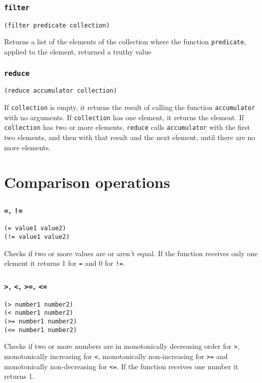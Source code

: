\documentclass[11pt]{scrreprt}
\begin{document}
\subsubsection{\texttt{filter}}
\begin{verbatim}
(filter predicate collection)
\end{verbatim}
Returns a list of the elements of the collection where the function \texttt{predicate}, applied to the element, returned a truthy value

\subsubsection{\texttt{reduce}}
\begin{verbatim}
(reduce accumulator collection)
\end{verbatim}
If \texttt{collection} is empty, it returns the result of calling the function \texttt{accumulator} with no arguments. If \texttt{collection} has one element, it returns the element. If \texttt{collection} has two or more elements, \texttt{reduce} calls \texttt{accumulator} with the first two elements, and then with that result and the next element, until there are no more elements.


\section{Comparison operations}
\label{ComparisonOp}
\subsubsection{\texttt{=}, \texttt{!=}}
\begin{verbatim}
(= value1 value2)
(!= value1 value2)
\end{verbatim}
Checks if two or more values are or aren't equal. If the function receives only one element it returns 1 for \texttt{=} and 0 for \texttt{!=}.

\subsubsection{\texttt{>}, \texttt{<}, \texttt{>=}, \texttt{<=}}
\begin{verbatim}
(> number1 number2)
(< number1 number2)
(>= number1 number2)
(<= number1 number2)
\end{verbatim}
Checks if two or more numbers are in monotonically decreasing order for \texttt{>}, monotonically increasing for \texttt{<}, monotonically non-increasing for \texttt{>=} and monotonically non-decreasing for \texttt{<=}. If the function receives one number it returns 1.
\end{document}
